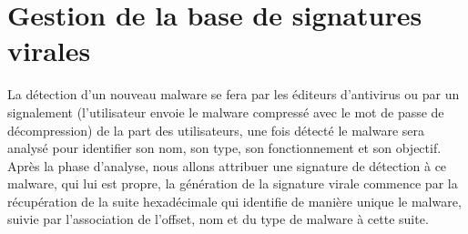 \section{Gestion de la base de signatures virales}
La détection d'un nouveau malware se fera par les éditeurs d'antivirus ou par un signalement (l'utilisateur envoie le malware compressé avec le mot de passe de décompression) de la part des utilisateurs, une fois détecté le malware sera analysé pour identifier son nom, son type,  son fonctionnement et son objectif.\\

    
Après la phase d'analyse, nous allons attribuer une signature de détection à ce malware, qui lui est propre, la génération de la signature virale commence par la récupération  de la suite hexadécimale qui identifie de manière unique le malware, suivie par l'association de l'offset, nom et du type de malware à cette suite.\\


